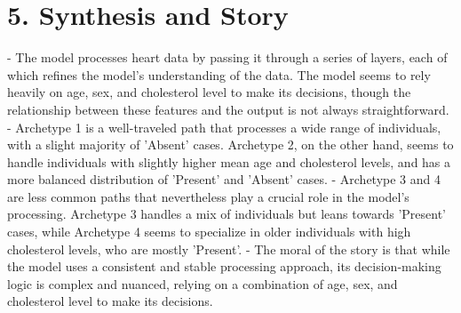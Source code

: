 \section*{5. Synthesis and Story}
- The model processes heart data by passing it through a series of layers, each of which refines the model's understanding of the data. The model seems to rely heavily on age, sex, and cholesterol level to make its decisions, though the relationship between these features and the output is not always straightforward.
- Archetype 1 is a well-traveled path that processes a wide range of individuals, with a slight majority of 'Absent' cases. Archetype 2, on the other hand, seems to handle individuals with slightly higher mean age and cholesterol levels, and has a more balanced distribution of 'Present' and 'Absent' cases.
- Archetype 3 and 4 are less common paths that nevertheless play a crucial role in the model's processing. Archetype 3 handles a mix of individuals but leans towards 'Present' cases, while Archetype 4 seems to specialize in older individuals with high cholesterol levels, who are mostly 'Present'.
- The moral of the story is that while the model uses a consistent and stable processing approach, its decision-making logic is complex and nuanced, relying on a combination of age, sex, and cholesterol level to make its decisions.